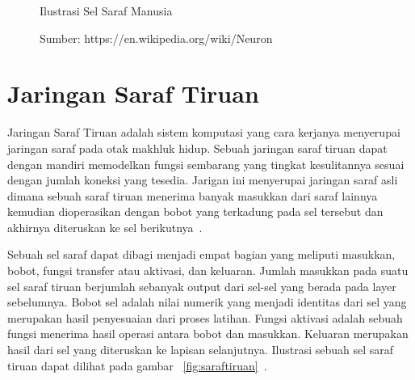 \begin{figure}[htbp]
    \begin{center}
    \end{center}
    \vspace{-20pt}
    \captionsetup{labelfont=bf, textfont=bf}
    \caption{Ilustrasi Sel Saraf Manusia}
    \vspace{-10pt}
    \captionsetup{labelfont=md, textfont=md}
    \caption*{Sumber: https://en.wikipedia.org/wiki/Neuron}
    \label{fig:selsaraf}
\end{figure}

\pagebreak

\section{Jaringan Saraf Tiruan}
\label{sec:2-JaringanSarafTiruan}

Jaringan Saraf Tiruan adalah sistem komputasi yang cara kerjanya menyerupai jaringan saraf pada otak
makhluk hidup. Sebuah jaringan saraf tiruan dapat dengan mandiri
memodelkan fungsi sembarang yang tingkat kesulitannya sesuai dengan jumlah koneksi yang tesedia.
Jarigan ini menyerupai jaringan saraf asli dimana
sebuah saraf tiruan menerima banyak masukkan dari saraf lainnya
kemudian dioperasikan dengan bobot yang terkadung pada sel tersebut dan akhirnya diteruskan ke sel
berikutnya~\cite{Sharma2012ACS}.

Sebuah sel saraf dapat dibagi menjadi empat bagian yang meliputi masukkan, bobot, fungsi
transfer atau aktivasi, dan keluaran. Jumlah masukkan pada suatu sel saraf tiruan berjumlah sebanyak
output dari sel-sel yang berada pada layer sebelumnya. Bobot sel adalah nilai numerik yang menjadi
identitas dari sel yang merupakan hasil penyesuaian dari proses latihan. Fungsi aktivasi adalah
sebuah fungsi menerima hasil operasi antara bobot dan masukkan. Keluaran merupakan hasil dari sel
yang diteruskan ke lapisan selanjutnya. Ilustrasi sebuah sel saraf tiruan dapat dilihat pada gambar
~\ref{fig:saraftiruan}~\cite{Sharma2012ACS}.

